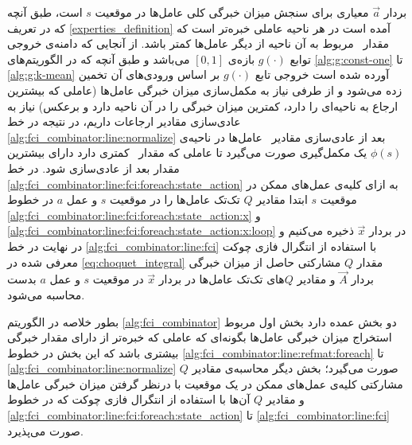 بردار $\vec{a}$ معیاری برای سنجش میزان خبرگی کلی عامل‌ها در موقعیت $s$ است، طبق آنچه که در تعریف
\ref{experties_definition}
آمده است در هر ناحیه‌ عاملی خبره‌تر است که مقدار \ مربوط به آن ناحیه از دیگر عامل‌ها کمتر باشد. از آنجایی که دامنه‌ی خروجی توابع $g(\cdot)$ بازه‌ی $[0, 1]$ می‌باشد و طبق آنچه که در الگوریتم‌های \ref{alg:g:const-one} تا \ref{alg:g:k-mean} آورده شده است خروجی تابع $g(\cdot)$ بر اساس ورودی‌های آن تخمین زده می‌شود و از طرفی نیاز به مکمل‌سازی میزان خبرگی عامل‌ها (عاملی که بیشترین ارجاع به ناحیه‌ای را دارد، کمترین میزان خبرگی را در آن ناحیه دارد و برعکس) نیاز به عادی‌سازی مقادیر ارجاعات داریم، در نتیجه در خط \ref{alg:fci_combinator:line:normalize} بعد از عادی‌سازی مقادیر \ عامل‌ها در ناحیه‌ی $\phi(s)$ یک مکمل‌‌گیری صورت می‌گیرد تا عاملی که مقدار \ کمتری دارد دارای بیشترین مقدار بعد از عادی‌سازی شود. در خط \ref{alg:fci_combinator:line:fci:foreach:state_action} به ازای کلیه‌ی عمل‌های ممکن در موقعیت $s$ ابتدا مقادیر $Q$ تک‌تک عامل‌ها را در موقعیت $s$ و عمل $a$ در خطوط \ref{alg:fci_combinator:line:fci:foreach:state_action:x} و \ref{alg:fci_combinator:line:fci:foreach:state_action:x:loop} در بردار $\vec{x}$ ذخیره می‌کنیم و در نهایت در خط \ref{alg:fci_combinator:line:fci} با استفاده از انتگرال فازی چوکت معرفی شده در \ref{eq:choquet_integral} مقدار $Q$ مشارکتی حاصل از میزان خبرگی بردار $\vec{A}$ و مقادیر $Q$‌های تک‌تک عامل‌ها در بردار $\vec{x}$ در موقعیت $s$ و عمل $a$ بدست محاسبه می‌شود.

\label{sec:sub:determine_f_g}
بطور خلاصه در الگوریتم \ref{alg:fci_combinator} دو بخش عمده دارد بخش اول مربوط استخراج میزان خبرگی عامل‌ها بگونه‌ای که عاملی که خبره‌تر از دارای مقدار خبرگی بیشتری باشد که این بخش در خطوط \ref{alg:fci_combinator:line:refmat:foreach} تا \ref{alg:fci_combinator:line:normalize} صورت می‌گیرد؛ بخش دیگر محاسبه‌ی مقادیر $Q$ مشارکتی کلیه‌ی عمل‌های ممکن در یک موقعیت با درنظر گرفتن میزان خبرگی عامل‌ها و مقادیر $Q$ آن‌ها با استفاده از انتگرال فازی چوکت که در خطوط \ref{alg:fci_combinator:line:fci:foreach:state_action} تا \ref{alg:fci_combinator:line:fci} صورت می‌پذیرد.

